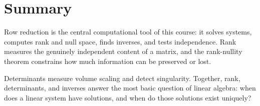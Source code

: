 \documentclass[11pt]{article}
\begin{document}
\section*{Summary}

Row reduction is the central computational tool of this course: it solves systems, computes rank and null space, finds inverses, and tests independence. Rank measures the genuinely independent content of a matrix, and the rank-nullity theorem constrains how much information can be preserved or lost.

Determinants measure volume scaling and detect singularity. Together, rank, determinants, and inverses answer the most basic question of linear algebra: when does a linear system have solutions, and when do those solutions exist uniquely?
\end{document}
